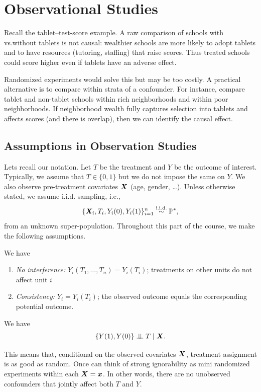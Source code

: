 \documentclass[11pt]{exam}
\begin{document}

\begingroup\small

\section{Observational Studies}
Recall the tablet–test-score example. A raw comparison of schools with vs.without tablets is not causal: wealthier schools are more likely to adopt tablets and to have resources (tutoring, staffing) that raise scores. Thus treated schools could score higher even if tablets have an adverse effect.

Randomized experiments would solve this but may be too costly. A practical alternative is to compare within strata of a confounder. For instance, compare tablet and non-tablet schools within rich neighborhoods and within poor neighborhoods. If neighborhood wealth fully captures selection into tablets and affects scores (and there is overlap), then we can identify the causal effect.
\subsection{Assumptions in Observation Studies}
Lets recall our notation. Let $T$ be the treatment and $Y$ be the outcome of interest. Typically, we assume that $T \in \{0, 1\}$ but we do not impose the same on $Y$. We also observe pre-treatment covariates $\bm{X}$ (age, gender, \ldots). Unless otherwise stated, we assume i.i.d. sampling, i.e.,
\[
    \{\bm{X}_i, T_i, Y_i(0), Y_i(1)\}_{i=1}^n \overset{\text{i.i.d.}}{\sim} \mathbb{P}^\ast,
\]
from an unknown super-population. Throughout this part of the course, we make the following assumptions.
\begin{assumption}[SUTVA]\label{ass:sutva}
We have 
\begin{enumerate}
    \item \emph{No interference:} $Y_i(T_1,\dots,T_n)=Y_i(T_i)$; treatments on other units do not affect unit $i$
    \item \emph{Consistency:} $Y_i = Y_i(T_i)$; the observed outcome equals the corresponding potential outcome.
\end{enumerate}
\end{assumption}

\begin{assumption}\label{ass:strong_ignorability}
    We have
    \[
    \{Y(1), Y(0)\} \perp\!\!\!\perp T \mid \bm{X}.
    \]
\end{assumption}
This means that, conditional on the observed covariates $\bm{X}$, treatment assignment is as good as random. Once can think of strong ignorability as mini randomized experiments within each $\bm{X} = \bm{x}$. In other words, there are no unobserved confounders that jointly affect both $T$ and $Y$. 
\end{document}
